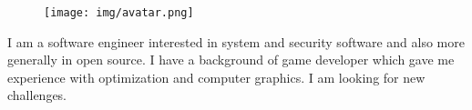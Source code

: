 \documentclass{mycv}
\begin{document}
\begin{paracol}{3}

  \begin{figure}[h!]
    \centering
    \texttt{[image: img/avatar.png]}
  \end{figure}

  \vspace{1cm}


\vspace{10mm}


{\small{
    I am a software engineer interested in system and security software and also more generally in open source. I have a background of game developer which gave me experience with optimization and computer graphics. I am looking for new challenges.
  }
}

\vspace{10mm}


\end{paracol}
\end{document}
